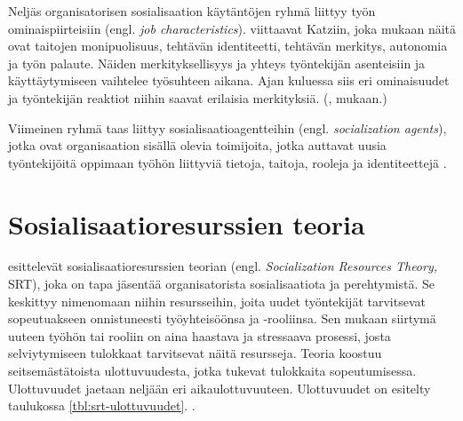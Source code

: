 \documentclass[utf8]{gradu3}
\begin{document}
Neljäs organisatorisen sosialisaation käytäntöjen ryhmä liittyy työn ominaispiirteisiin (engl. \textit{job characteristics}). \textcite{saks-gruman-2012} viittaavat Katziin, joka mukaan näitä ovat taitojen monipuolisuus, tehtävän identiteetti, tehtävän merkitys, autonomia ja työn palaute. Näiden merkityksellisyys ja yhteys työntekijän asenteisiin ja käyttäytymiseen vaihtelee työsuhteen aikana. Ajan kuluessa siis eri ominaisuudet ja työntekijän reaktiot niihin saavat erilaisia merkityksiä. (\textcite{katz-1980}, \textcite{saks-gruman-2012} mukaan.)

Viimeinen ryhmä taas liittyy sosialisaatioagentteihin (engl. \textit{socialization agents}), jotka ovat organisaation sisällä olevia toimijoita, jotka auttavat uusia työntekijöitä oppimaan työhön liittyviä tietoja, taitoja, rooleja ja identiteettejä \parencite{saks-gruman-2012}.

\section{Sosialisaatioresurssien teoria}
\label{luku-SRT-teoria}

\textcite{saks-gruman-2012} esittelevät sosialisaatioresurssien teorian (engl. \textit{Socialization Resources Theory,} SRT), joka on tapa jäsentää organisatorista sosialisaatiota ja perehtymistä. Se keskittyy nimenomaan niihin resursseihin, joita uudet työntekijät tarvitsevat sopeutuakseen onnistuneesti työyhteisöönsa ja -rooliinsa. Sen mukaan siirtymä uuteen työhön tai rooliin on aina haastava ja stressaava prosessi, josta selviytymiseen tulokkaat tarvitsevat näitä resursseja. Teoria koostuu seitsemästätoista ulottuvuudesta, jotka tukevat tulokkaita sopeutumisessa. Ulottuvuudet jaetaan neljään eri aikaulottuvuuteen. Ulottuvuudet on esitelty taulukossa \ref{tbl:srt-ulottuvuudet}. \parencite{saks-gruman-2012}.
\end{document}
